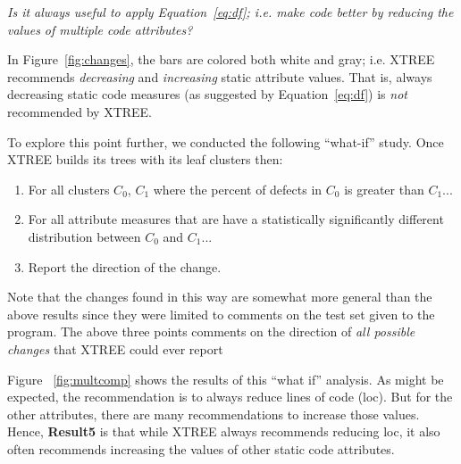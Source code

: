 \documentclass[twocolumn,5p]{elsarticle}
\newcommand{\be}{\begin{enumerate}}
\newcommand{\ee}{\end{enumerate}}
\newcommand{\fig}[1]{Figure~\ref{fig:#1}}
\newcommand{\eq}[1]{Equation~\ref{eq:#1}}
\theoremstyle{break}
\begin{document}
\begin{itemize}
{\em  Is  it  always  useful  to  apply \eq{df};  i.e.   make  code  better  by  reducing  the  values  of multiple code attributes?}

In  \fig{changes}, the bars are colored both white and gray; i.e. XTREE recommends {\em decreasing} and {\em increasing} 
static attribute values. That is, always decreasing static code measures (as suggested by \eq{df}) is {\em not} recommended by XTREE.

To explore this point further, we conducted the following ``what-if'' study. Once XTREE builds its trees with its leaf clusters then:
\be
\item For all clusters $C_0$, $C_1$ where the percent of defects in $C_0$ is greater than $C_1$...
\item For all attribute measures that are have a statistically significantly different distribution  between $C_0$ and $C_1$...
\item Report the direction of the change.
\ee
Note that the changes found in this way are somewhat more general than the above results
since they were  limited
to comments on the test set given to the program. The above three points comments on the direction of {\em all possible changes}
that XTREE could ever report


Figure ~\ref{fig:multcomp} shows the results of this ``what if'' analysis. As might be expected, the recommendation is to
always reduce lines of code (loc). But for the other attributes, there are many recommendations to increase those values.
Hence, {\bf Result5} is that while XTREE always  recommends reducing loc,
it also   often recommends increasing the values of other static code attributes.   









\end{itemize}
\end{document}
